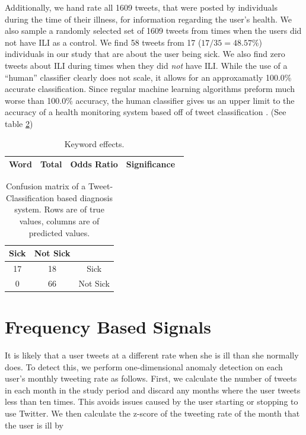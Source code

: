 \documentclass{acm_proc_article-sp}
\begin{document}
Additionally, we hand rate all 1609 tweets, that were posted by individuals during the time of their illness,  for information regarding the user's health.  We also sample a randomly selected set of 1609 tweets from times when the users did not have ILI as a control. We find 58 tweets from 17 (\(17/35 = 48.57\%\))  individuals in our study that are about the user being sick. We also find zero tweets about ILI during times when they did \textit{not} have ILI. While the use of a ``human'' classifier clearly does not scale, it allows for an approxamatly 100.0\% accurate classification. Since regular machine learning algorithms preform much worse than 100.0\% accuracy, the human classifier gives us an upper limit to the accuracy of  a health monitoring system based off of tweet classification . (See table \ref{tab:tweet_classified_confusion})

%

\begin{table}
\centering
\begin{tabular}{|c|c|c|c|} \hline
Word& Total &Odds Ratio & Significance\ \\ \hline

\end{tabular}
\caption{Keyword effects.}
\label{tab:tweet_keyword_expert_results}
\end{table}


\begin{table}
\centering
\begin{tabular}{|c|c|c|} \hline
Sick&Not Sick&\ \\ \hline
17 & 18 & Sick\\ \hline
0 & 66  & Not Sick\\
\hline\end{tabular}
\caption{Confusion matrix of a Tweet-Classification based diagnosis system. Rows are of true values, columns are of predicted values.}
\label{tab:tweet_classified_confusion}
\end{table}

\section{Frequency Based Signals}

It is likely that a user tweets at a different rate when she is ill than she normally does. To detect this, we perform one-dimensional anomaly detection on each user's monthly tweeting rate as follows. First, we calculate the number of tweets in each month in the study period and discard any months where the user tweets less than ten times. This avoids issues caused by the user starting or stopping to use Twitter. We then calculate the z-score of the tweeting rate of the month that the user is ill by
\end{document}

